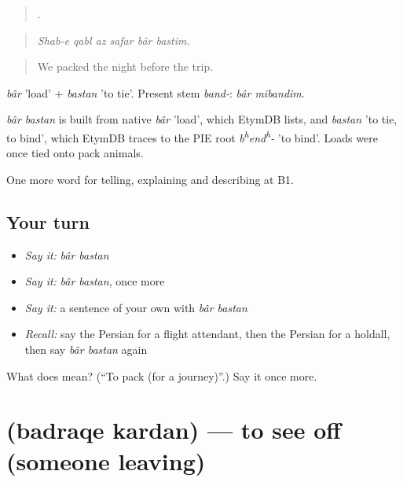\begin{quote}
     .
\end{quote}

\begin{quote}
\emph{Shab-e qabl az safar bâr bastim.}
\end{quote}

\begin{quote}
We packed the night before the trip.
\end{quote}

\emph{bâr} 'load' + \emph{bastan} 'to tie'. Present stem \emph{band-}: \emph{bâr mibandim}.

\begin{cousinweb}
\emph{bâr bastan} is built from native \emph{bâr} 'load', which EtymDB lists, and \emph{bastan} 'to tie, to bind', which EtymDB traces to the PIE root \emph{b\textsuperscript{h}end\textsuperscript{h}-} 'to bind'. Loads were once tied onto pack animals.
\end{cousinweb}

\begin{grammarlens}[title={What you've built}]
One more word for telling, explaining and describing at B1.
\end{grammarlens}

\subsection*{Your turn}
\begin{itemize}
\raggedright
  \item \emph{Say it:} \emph{bâr bastan}
  \item \emph{Say it:} \emph{bâr bastan}, once more
  \item \emph{Say it:} a sentence of your own with \emph{bâr bastan}
  \item \emph{Recall:} say the Persian for a flight attendant, then the Persian for a holdall, then say \emph{bâr bastan} again
\end{itemize}

\begin{tcolorbox}[breakable,colback=teal!4,colframe=teal!35!black,title={Before you move on}]
What does   mean? (\textquotedblleft{}To pack (for a journey)\textquotedblright{}.) Say it once more.
\end{tcolorbox}
\section[\texorpdfstring{\fa{بدرقه} \fa{کردن} (badraqe kardan)}{بدرقه کردن (badraqe kardan)}]{  (badraqe kardan) — to see off (someone leaving)}

